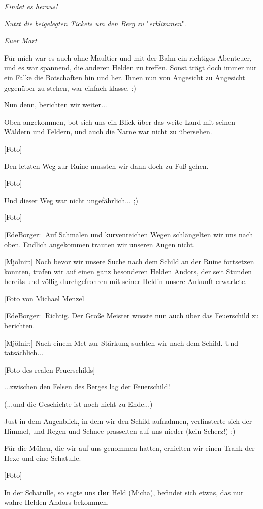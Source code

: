 \documentclass[10pt, a4paper, oneside]{book}
\begin{document}
\begin{multicols}{2}
\textit{Findet es heraus!}

\textit{Nutzt die beigelegten Tickets um den Berg zu }"\textit{erklimmen}".

\textit{Euer Mart}]


Für mich war es auch ohne Maultier und mit der Bahn ein richtiges Abenteuer, und es war spannend, die anderen Helden zu treffen. Sonst trägt doch immer nur ein Falke die Botschaften hin und her. Ihnen nun von Angesicht zu Angesicht gegenüber zu stehen, war einfach klasse. :)

Nun denn, berichten wir weiter...

Oben angekommen, bot sich uns ein Blick über das weite Land mit seinen Wäldern und Feldern, und auch die Narne war nicht zu übersehen.

[Foto]

Den letzten Weg zur Ruine mussten wir dann doch zu Fuß gehen.

[Foto]

Und dieser Weg war nicht ungefährlich... ;)

[Foto]

[EdeBorger:] Auf Schmalen und kurvenreichen Wegen schlängelten wir uns nach oben. Endlich angekommen trauten wir unseren Augen nicht.

[Mjölnir:] Noch bevor wir unsere Suche nach dem Schild an der Ruine fortsetzen konnten, trafen wir auf einen ganz besonderen Helden Andors, der seit Stunden bereits und völlig durchgefrohren mit seiner Heldin unsere Ankunft erwartete.

[Foto von Michael Menzel]

[EdeBorger:] Richtig. Der Große Meister wusste nun auch über das Feuerschild zu berichten.

[Mjölnir:] Nach einem Met zur Stärkung suchten wir nach dem Schild. Und tatsächlich...

[Foto des realen Feuerschilds]

...zwischen den Felsen des Berges lag der Feuerschild!

(...und die Geschichte ist noch nicht zu Ende...)

Just in dem Augenblick, in dem wir den Schild aufnahmen, verfinsterte sich der Himmel, und Regen und Schnee prasselten auf uns nieder (kein Scherz!) :)

Für die Mühen, die wir auf uns genommen hatten, erhielten wir einen Trank der Hexe und eine Schatulle.

[Foto]

In der Schatulle, so sagte uns \textbf{der} Held (Micha), befindet sich etwas, das nur wahre Helden Andors bekommen.


\end{multicols}
\end{document}
